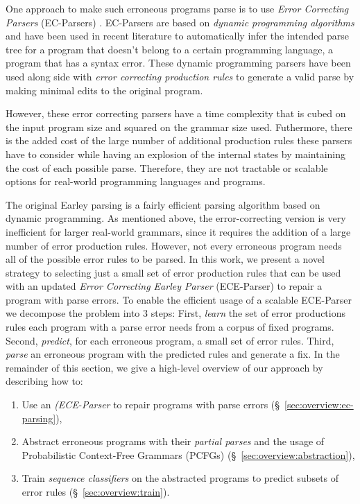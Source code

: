 One approach to make such erroneous programs parse is to use \emph{Error
Correcting Parsers} (EC-Parsers) \citep{Aho_1972}. EC-Parsers are based on
\emph{dynamic programming algorithms} and have been used in recent literature to
automatically infer the intended parse tree for a program that doesn't belong to
a certain programming language, \ie a program that has a syntax error. These
dynamic programming parsers have been used along side with \emph{error
correcting production rules} \citep{Aho_1972} to generate a valid parse by
making minimal edits to the original program.

However, these error correcting parsers have a time complexity that is cubed on
the input program size and squared on the grammar size used. Futhermore, there
is the added cost of the large number of additional production rules these
parsers have to consider while having an explosion of the internal states by
maintaining the cost of each possible parse. Therefore, they are not tractable
or scalable options for real-world programming languages and programs.


The original Earley parsing is a fairly efficient parsing algorithm
\citep{Earley_1970} based on dynamic programming. As mentioned above, the
error-correcting version is very inefficient for larger real-world grammars,
since it requires the addition of a large number of error production rules.
However, not every erroneous program needs all of the possible error rules to be
parsed. In this work, we present a novel strategy to selecting just a small set
of error production rules that can be used with an updated \emph{Error
Correcting Earley Parser} (ECE-Parser) to repair a program with parse errors.
%
To enable the efficient usage of a scalable ECE-Parser we decompose the problem
into 3 steps:
%
First, \emph{learn} the set of error productions rules each program with a parse
error needs from a corpus of fixed programs.
%
Second, \emph{predict}, for each erroneous program, a small set of error rules.
%
Third, \emph{parse} an erroneous program with the predicted rules and generate a
fix.
%
In the remainder of this section, we give a high-level overview
of our approach by describing how to:

\begin{enumerate}

  \item Use an \emph{(ECE-Parser} to repair programs with parse errors
  (\S~\ref{sec:overview:ec-parsing}),

  \item Abstract erroneous programs with their \emph{partial parses} and the
  usage of Probabilistic Context-Free Grammars (PCFGs)
  (\S~\ref{sec:overview:abstraction}),

  \item Train \emph{sequence classifiers} on the abstracted programs to predict
  subsets of error rules (\S~\ref{sec:overview:train}).

\end{enumerate}

